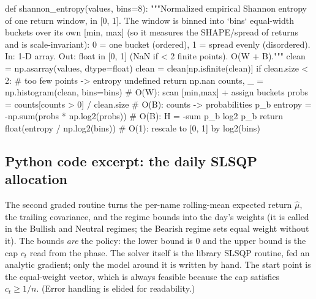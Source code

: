 \documentclass[a4paper,12pt]{article}
\begin{document}
\begin{code}[caption={Core entropy computation used in the notebooks},label={lst:entropy}]
def shannon_entropy(values, bins=8):
    """Normalized empirical Shannon entropy of one return window, in [0, 1].
    The window is binned into `bins` equal-width buckets over its own [min, max]
    (so it measures the SHAPE/spread of returns and is scale-invariant): 0 = one
    bucket (ordered), 1 = spread evenly (disordered).
    In: 1-D array. Out: float in [0, 1] (NaN if < 2 finite points). O(W + B)."""
    clean = np.asarray(values, dtype=float)
    clean = clean[np.isfinite(clean)]
    if clean.size < 2:                          # too few points -> entropy undefined
        return np.nan
    counts, _ = np.histogram(clean, bins=bins)  # O(W): scan [min,max] + assign buckets
    probs = counts[counts > 0] / clean.size     # O(B): counts -> probabilities p_b
    entropy = -np.sum(probs * np.log2(probs))   # O(B): H = -sum p_b log2 p_b
    return float(entropy / np.log2(bins))       # O(1): rescale to [0, 1] by log2(bins)
\end{code}

\subsection{Python code excerpt: the daily SLSQP allocation}

The second graded routine turns the per-name rolling-mean expected return $\widehat\mu$, the trailing covariance, and the regime bounds into the day's weights (it is called in the Bullish and Neutral regimes; the Bearish regime sets equal weight without it). The bounds \emph{are} the policy: the lower bound is $0$ and the upper bound is the cap $c_t$ read from the phase. The solver itself is the library SLSQP routine, fed an analytic gradient; only the model around it is written by hand. The start point is the equal-weight vector, which is always feasible because the cap satisfies $c_t\ge 1/n$. (Error handling is elided for readability.)
\end{document}
